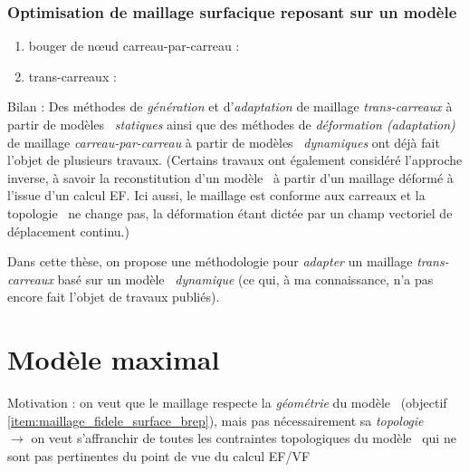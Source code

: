 \subsubsection{Optimisation de maillage surfacique reposant sur un modèle \brep} 
\begin{enumerate}
	\item bouger de n\oe ud carreau-par-carreau : \cite{gargallo2014}
	\item trans-carreaux : \cite{noel1995}
\end{enumerate}








Bilan : 
Des méthodes de \textit{génération} et d'\textit{adaptation} de maillage \textit{trans-carreaux} à partir de modèles \brep\ \textit{statiques} \cite{noel1995, foucault2008} ainsi que des méthodes de \textit{déformation (adaptation)} de maillage \textit{carreau-par-carreau} à partir de modèles \brep\ \textit{dynamiques} \cite{martin2017} ont déjà fait l'objet de plusieurs travaux. 
(Certains travaux \cite{louhichi2015} ont également considéré l'approche inverse, à savoir la reconstitution d'un modèle \brep\ à partir d'un maillage déformé à l'issue d'un calcul EF. 
Ici aussi, le maillage est conforme aux carreaux et la topologie \brep\ ne change pas, la déformation étant dictée par un champ vectoriel de déplacement continu.)
\par
Dans cette thèse, on propose une méthodologie pour \textit{adapter} un maillage \textit{trans-carreaux} basé sur un modèle \brep\ \textit{dynamique} (ce qui, à ma connaissance, n'a pas encore fait l'objet de travaux publiés).



\section{Modèle maximal}
Motivation : on veut que le maillage respecte la \textit{géométrie} du modèle \brep\ (\cf objectif \ref{item:maillage_fidele_surface_brep}), mais pas nécessairement sa \textit{topologie}\\
$\to$ on veut s'affranchir de toutes les contraintes topologiques du modèle \brep\ qui ne sont pas pertinentes du point de vue du calcul EF/VF


